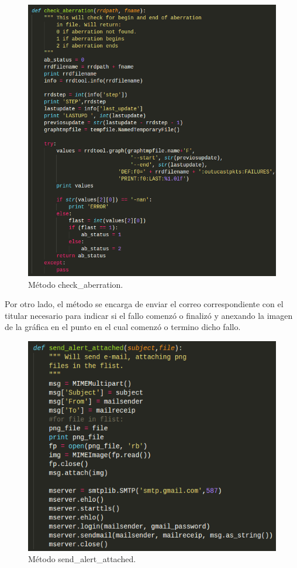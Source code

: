 \begin{figure}[htbp!]
		\centering
			\includegraphics[width=.75 \textwidth]{images/codigo5}
		\caption{Método check\_aberration.}
		\label{image:codigo5}
\end{figure}
\FloatBarrier
Por otro lado, el método se encarga de enviar el correo correspondiente con el titular necesario para indicar si el fallo comenzó o finalizó y anexando la imagen de la gráfica en el punto en el cual comenzó o termino dicho fallo.
\FloatBarrier
\begin{figure}[htbp!]
		\centering
			\includegraphics[width=.7 \textwidth]{images/codigo6}
		\caption{Método send\_alert\_attached.}
		\label{image:codigo6}
\end{figure}
\FloatBarrier
